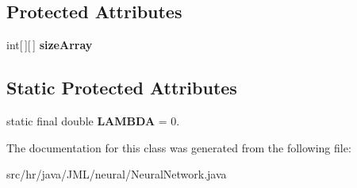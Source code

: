 \subsection*{Protected Attributes}
\begin{DoxyCompactItemize}
\item 
\hypertarget{classhr_1_1java_1_1_j_m_l_1_1neural_1_1_neural_network_a522ff13cc9fa9d4ab160032a0bf182f9}{int\mbox{[}$\,$\mbox{]}\mbox{[}$\,$\mbox{]} {\bfseries size\+Array}}\label{classhr_1_1java_1_1_j_m_l_1_1neural_1_1_neural_network_a522ff13cc9fa9d4ab160032a0bf182f9}

\end{DoxyCompactItemize}
\subsection*{Static Protected Attributes}
\begin{DoxyCompactItemize}
\item 
\hypertarget{classhr_1_1java_1_1_j_m_l_1_1neural_1_1_neural_network_a40416a35caa49558ee5d030d1f77de69}{static final double {\bfseries L\+A\+M\+B\+D\+A} = 0.}\label{classhr_1_1java_1_1_j_m_l_1_1neural_1_1_neural_network_a40416a35caa49558ee5d030d1f77de69}

\end{DoxyCompactItemize}


The documentation for this class was generated from the following file\+:\begin{DoxyCompactItemize}
\item 
src/hr/java/\+J\+M\+L/neural/Neural\+Network.\+java\end{DoxyCompactItemize}
